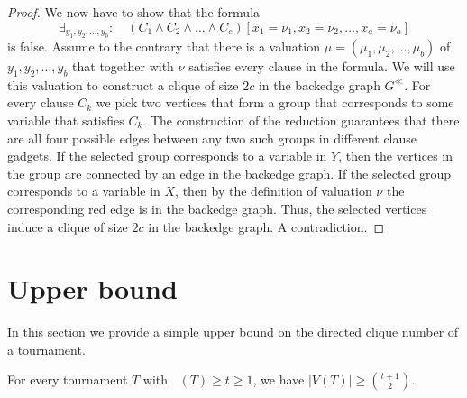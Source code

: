 \documentclass[a4paper,USenglish,cleveref,autoref,thm-restate,pdfa]{lipics-v2021}
\let\geq\geqslant
\newcommand{\norm}[1]{\left|#1\right|}
\newcommand{\ora}[1]{\overrightarrow{#1}}
\DeclareMathOperator{\diomega}{\ora \omega}
\begin{document}
\begin{proof}
    We now have to show that the formula $$\exists_{y_1,y_2,\ldots,y_b}:\quad (C_1 \wedge C_2 \wedge \ldots \wedge C_c)[x_1=\nu_1,x_2=\nu_2,\ldots,x_a=\nu_a]$$ is false.
    Assume to the contrary that there is a valuation $\mu=(\mu_1,\mu_2,\ldots,\mu_b)$ of $y_1,y_2,\ldots,y_b$ that together with $\nu$ satisfies every clause in the formula.
    We will use this valuation to construct a clique of size \(2c\) in the backedge graph \(G^{\ll}\).
    For every clause \(C_k\) we pick two vertices that form a group that corresponds to some variable that satisfies $C_k$.
    The construction of the reduction guarantees that there are all four possible edges between any two such groups in different clause gadgets.
    If the selected group corresponds to a variable in $Y$, then the vertices in the group are connected by an edge in the backedge graph.
    If the selected group corresponds to a variable in $X$, then by the definition of valuation $\nu$ the corresponding red edge is in the backedge graph.
    Thus, the selected vertices induce a clique of size \(2c\) in the backedge graph.
    A contradiction.
\end{proof}

\section{Upper bound}\label{sec:upper_bound}
In this section we provide a simple upper bound on the directed clique number of a tournament.

\begin{theorem}\label{thm:upper_bound}
    For every tournament \(T\) with \(\diomega(T) \ge t \ge 1\), we have \(\norm{V(T)} \geq {{t+1}\choose{2}}\).
\end{theorem}
\end{document}
